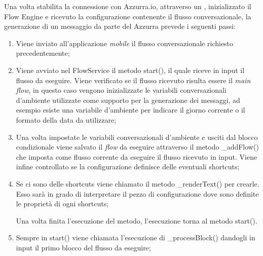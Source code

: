 Una volta stabilita la connessione con Azzurra.io, attraverso un , inizializzato il Flow Engine e ricevuto la configurazione  contenente il flusso conversazionale, la generazione di un messaggio da parte del  Azzurra prevede i seguenti passi:\\
\begin{enumerate}
	\item Viene inviato all’applicazione \emph{mobile} il flusso conversazionale richiesto precedentemente;
	\item Viene avviato nel FlowService il metodo start(), il quale riceve in input il flusso da eseguire. Viene verificato se il flusso ricevuto risulta essere il \emph{main flow}, in questo caso vengono inizializzate le variabili conversazionali d'ambiente utilizzate come supporto per la generazione dei messaggi, ad esempio esiste una variabile d'ambiente per indicare il giorno corrente o il formato della data da utilizzare;
	\item Una volta impostate le variabili conversazionali d’ambiente e usciti dal blocco condizionale viene salvato il \emph{flow} da eseguire attraverso il metodo \_addFlow() che imposta come flusso corrente da eseguire il flusso ricevuto in input. Viene infine controllato se la configurazione definisce delle eventuali shortcuts;
	\item Se ci sono delle shortcuts viene chiamato il metodo \_renderText() per crearle. Esso sarà in grado di interpretare il pezzo di configurazione dove sono definite le proprietà di ogni shortcuts;
	
	Una volta finita l'esecuzione del metodo, l'esecuzione torna al metodo start().
	\item Sempre in start() viene chiamata l'esecuzione di \_processBlock() dandogli in input il primo blocco del flusso da eseguire;
	

\end{enumerate}
